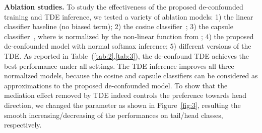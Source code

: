 \documentclass{article}
\begin{document}
\textbf{Ablation studies.} To study the effectiveness of the proposed de-confounded training and TDE inference, we tested a variety of ablation models: 1) the linear classifier baseline (no biased term); 2) the cosine classifier~\cite{gidaris2018dynamic, qi2018low}; 3) the capsule classifier~\cite{liu2019large}, where  is normalized by the non-linear function from \cite{sabour2017dynamic}; 4) the proposed de-confounded model with normal softmax inference; 5) different versions of the TDE. As reported in Table~(\ref{tab:2},\ref{tab:3}), the de-confound TDE achieves the best performance under all settings. The TDE inference improves all three normalized models, because the cosine and capsule classifiers can be considered as approximations to the proposed de-confounded model. To show that the mediation effect removed by TDE indeed controls the preference towards head direction, we changed the parameter  as shown in Figure~\ref{fig:3}, resulting the smooth increasing/decreasing of the performances on tail/head classes, respectively. 
\end{document}
